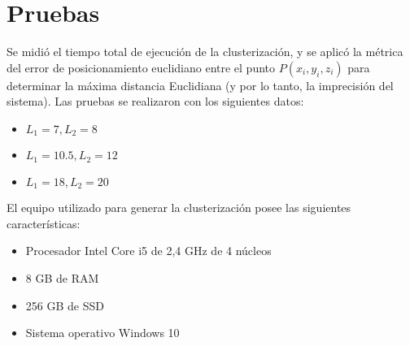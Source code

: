 \section{Pruebas}

Se midió el tiempo total de ejecución de la clusterización, y se aplicó la métrica del error de posicionamiento euclidiano entre el punto $P(x_i, y_i, z_i)$ para determinar la máxima distancia Euclidiana (y por lo tanto, la imprecisión del sistema). Las pruebas se realizaron con los siguientes datos:

\begin{itemize}
	\item $L_1 = 7, L_2 = 8$
	\item $L_1 = 10.5, L_2 = 12$
	\item $L_1 = 18, L_2 = 20$
\end{itemize}

El equipo utilizado para generar la clusterización posee las siguientes características:

\begin{itemize}
	\item Procesador Intel Core i5 de 2,4 GHz de 4 núcleos
	\item 8 GB de RAM
	\item 256 GB de SSD
	\item Sistema operativo Windows 10
\end{itemize}

